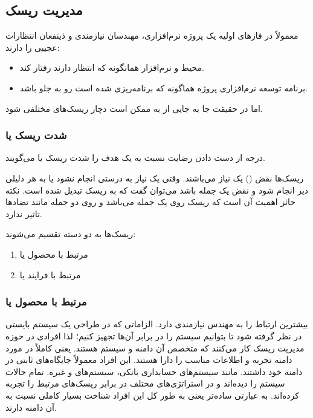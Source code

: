 \newpage

\subsection{مدیریت ریسک}

معمولاً در فاز‌های اولیه یک پروژه نرم‌افزاری، مهندسان نیازمندی و ذینفعان
انتظارات عجیبی را دارند:

\begin{itemize}
    \item محیط و نرم‌افزار همانگونه که انتظار دارند رفتار کند.
    \item برنامه توسعه نرم‌افزاری پروژه هماگونه که برنامه‌ریزی شده است رو به جلو
    باشد.
\end{itemize}

اما در حقیقت جا به جایی از  به  ممکن است دچار
ریسک‌های مختلفی شود.

\subsubsection{شدت ریسک یا }

درجه از دست دادن رضایت نسبت به یک هدف را شدت ریسک یا  می‌گویند.

ریسک‌ها نقض () یک نیاز می‌باشند. وقتی یک نیاز به درستی انجام نشود یا به
هر دلیلی دیر انجام شود و نقض یک جمله باشد می‌توان گفت که به ریسک تبدیل شده است.
نکته حائز اهمیت آن است که ریسک روی یک جمله می‌باشد و روی دو جمله مانند تضاد‌ها
تاثیر ندارد.

ریسک‌ها به دو دسته تقسیم می‌شوند:

\begin{enumerate}
    \item مرتبط با محصول یا 
    \item مرتبط با فرایند یا 
\end{enumerate}

\subsubsection{مرتبط با محصول یا }

بیشترین ارتباط را به مهندس نیازمندی دارد. الزاماتی که در طراحی یک سیستم بایستی
در نظر گرفته شود تا بتوانیم سیستم را در برابر آن‌ها تجهیز کنیم؛ لذا افرادی در
حوزه مدیریت ریسک کار می‌کنند که متخصص آن دامنه و سیستم هستند. یعنی کاملاً در
مورد دامنه تجربه و اطلاعات مناسب را دارا هستند. این افراد معمولاً جایگاه‌های
ثابتی در دامنه خود داشتند. مانند سیستم‌های حسابداری بانکی، سیستم‌های  و
غیره. تمام حالات سیستم را دیده‌اند و در استراتژی‌های مختلف در برابر ریسک‌های
مرتبط را تجربه کرده‌اند. به عبارتی ساده‌تر یعنی به طور کل این افراد شناخت بسیار
کاملی نسبت به آن دامنه دارند.

